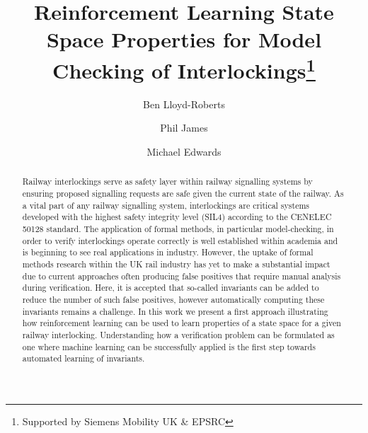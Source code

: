 \documentclass[runningheads]{llncs}
\begin{document}
%
\title{Reinforcement Learning  State Space Properties for Model Checking of Interlockings\thanks{Supported by Siemens Mobility UK \& EPSRC}}
%
%
\author{Ben Lloyd-Roberts \and
Phil James \and
Michael Edwards}
%
%


%
\maketitle              %
%
\begin{abstract}
Railway interlockings serve as safety layer within railway signalling systems by ensuring proposed signalling requests are safe given the current state of the railway. As a vital part of any railway signalling system, interlockings are critical systems developed with the highest safety integrity level (SIL4) according to the CENELEC 50128 standard. The application of formal methods, in particular model-checking, in order to verify interlockings operate correctly is well established within academia and is beginning to see real applications in industry. However, the uptake of formal methods research within the UK rail industry has yet to make a substantial impact due to current approaches often producing false positives that require manual analysis during verification. Here, it is accepted that so-called invariants can be added to reduce the number of such false positives, however automatically computing these invariants remains a challenge. In this work we present a first approach illustrating how reinforcement learning can be used to learn properties of a state space for a given railway interlocking. Understanding how a verification problem can be formulated as one where machine learning can be successfully applied is the first step towards automated learning of invariants.

\end{abstract}
\end{document}
